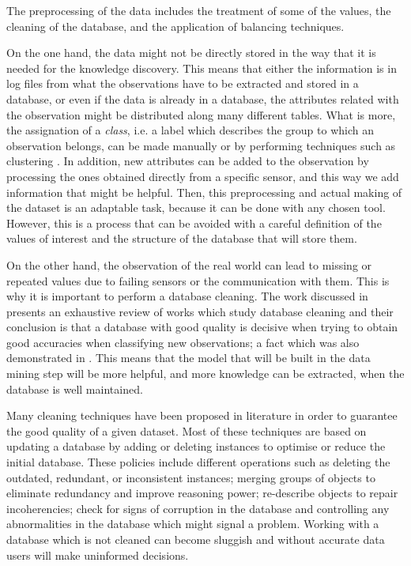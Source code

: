 The preprocessing of the data includes the treatment of some of the values, the cleaning of the database, and the application of balancing techniques.

On the one hand, the data might not be directly stored in the way that it is needed for the knowledge discovery. This means that either the information is in log files from what the observations have to be extracted and stored in a database, or even if the data is already in a database, the attributes related with the observation might be distributed along many different tables. What is more, the assignation of a \textit{class}, i.e. a label which describes the group to which an observation belongs, can be made manually or by performing techniques such as clustering \cite{witten2016data}. In addition, new attributes can be added to the observation by processing the ones obtained directly from a specific sensor, and this way we add information that might be helpful. Then, this preprocessing and actual making of the dataset is an adaptable task, because it can be done with any chosen tool. However, this is a process that can be avoided with a careful definition of the values of interest and the structure of the database that will store them.

On the other hand, the observation of the real world can lead to missing or repeated values due to failing sensors or the communication with them. This is why it is important to perform a database cleaning. The work discussed in \cite{wilson2001maintaining} presents an exhaustive review of works which study database cleaning and their conclusion is that a database with good quality is decisive when trying to obtain good accuracies when classifying new observations; a fact which was also demonstrated in \cite{zeineb2014thesis}. This means that the model that will be built in the data mining step will be more helpful, and more knowledge can be extracted, when the database is well maintained.

Many cleaning techniques have been proposed in literature \cite{wilson2001maintaining} in order to guarantee the good quality of
a given dataset. Most of these techniques are based on updating a database by adding or deleting instances to optimise or reduce the initial database. These policies include different operations such as deleting the outdated, redundant, or inconsistent instances; merging groups of objects to eliminate redundancy and improve reasoning power; re-describe objects to repair incoherencies; check for signs of corruption in the database and controlling any abnormalities in the database which might signal a problem. Working with a database which is not cleaned can become sluggish and without accurate data users will make uninformed decisions.

